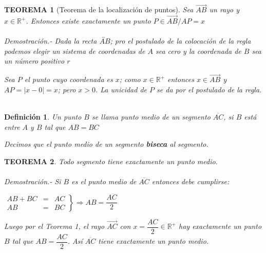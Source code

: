 \documentclass[10pt]{book}
\newtheorem{teo}{\textbf{TEOREMA}}[chapter]%
\newtheorem{def.}{\textbf{Definición}}[chapter]%
\begin{document}
\begin{teo}[Teorema de la localización de puntos]
Sea $\overrightarrow{AB}$
un rayo y $x\in \mathbb{R}^+$. Entonces existe exactamente un punto $P\in \overrightarrow{AB} / AP = x$\\\\
Demostración.- \; Dada la recta $\overleftrightarrow{AB}$; pro el postulado de la colocación de la regla podemos elegir un sistema de coordenadas de $A$ sea cero y la coordenada de $B$ sea un número positivo $r$
\begin{center}
\end{center}
Sea $P$ el punto cuyo coordenada es $x$; como $x\in \mathbb{R}^+$ entonces $x\in \overrightarrow{AB}$ y $AP=|x-0|=x$; pero $x>0$. La unicidad de $P$ se da por el postulado de la regla.\\\\
\end{teo}

\begin{tcolorbox}
\begin{def.}
Un punto $B$ se llama punto medio de un segmento $\overline{AC}$, si $B$ está entre $A$ y $B$ tal que $AB=BC$\\
\begin{center}
Decimos que el punto medio de un segmento \textbf{biseca} al segmento. \\
\end{center}
\end{def.}
\end{tcolorbox}

\begin{teo}
Todo segmento tiene exactamente un punto medio.\\\\
Demostración.- \; Si $B$ es el punto medio de $\overline{AC}$ entonces debe cumplirse: 
\begin{center}
$\left.
\begin{array}{rcl}
AB + BC & = & AC\\ 
AB & = & BC
\end{array}
\right\}
\Rightarrow AB = \dfrac{AC}{2}$
\end{center}
Luego por el Teorema 1, el rayo $\overrightarrow{AC}$ con $x=\dfrac{AC}{2} \in \mathbb{R}^+$ hay exactamente un punto $B$ tal que $AB=\dfrac{AC}{2}$. Así $\overline{AC}$ tiene exactamente un punto medio.\\\\ 
\end{teo}
\end{document}
